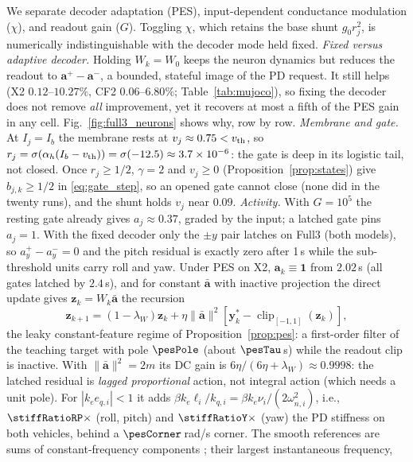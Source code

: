 \documentclass[letterpaper, 10 pt, conference]{ieeeconf}
\newcommand{\clip}{\operatorname{clip}}
\begin{document}
We separate decoder adaptation (PES), input-dependent conductance
modulation ($\chi$), and readout gain ($G$). Toggling $\chi$, which
retains the base shunt $g_0r_j^2$, is numerically indistinguishable with
the decoder mode held fixed. \emph{Fixed versus adaptive decoder.} Holding $W_k=W_0$ keeps the neuron
dynamics but reduces the readout to $\bm a^+-\bm a^-$, a bounded, stateful
image of the PD request. It still helps (X2 $0.12$--$10.27\%$, CF2
$0.06$--$6.80\%$; Table~\ref{tab:mujoco}), so fixing the decoder does not
remove \emph{all} improvement, yet it recovers at most a fifth of the PES
gain in any cell. Fig.~\ref{fig:full3_neurons} shows why, row by row.
\emph{Membrane and gate.} At $I_j=I_b$ the membrane rests at
$v_j\approx0.75<v_{\rm th}$, so
$r_j=\sigma(\alpha_h(I_b-v_{\rm th}))=\sigma(-12.5)\approx3.7\times10^{-6}$:
the gate is deep in its logistic tail, not closed. Once $r_j\ge1/2$,
$\gamma=2$ and $v_j\ge0$ (Proposition~\ref{prop:states}) give
$b_{j,k}\ge1/2$ in \eqref{eq:gate_step}, so an opened gate cannot close
(none did in the twenty runs), and the shunt holds $v_j$ near $0.09$.
\emph{Activity.} With $G=10^5$ the resting gate already gives
$a_j\approx0.37$, graded by the input; a latched gate pins $a_j=1$. With
the fixed decoder only the $\pm y$ pair latches on Full3 (both models), so
$a^+_y-a^-_y=0$ and the pitch residual is exactly zero after 1\,s while
the sub-threshold units carry roll and yaw. Under PES on X2,
$\bm a_k\equiv\bm1$ from $2.02$\,s (all gates latched by $2.4$\,s), and
for constant $\bar{\bm a}$ with inactive projection the direct update
gives $\bm z_k=W_k\bar{\bm a}$ the recursion
\begin{equation}
 \bm z_{k+1}=(1-\lambda_W)\bm z_k
 +\eta\|\bar{\bm a}\|^2[\bm y_k^*-\clip_{[-1,1]}(\bm z_k)],
 \label{eq:constantbasis}
\end{equation}
the leaky constant-feature regime of Proposition~\ref{prop:pes}: a
first-order filter of the teaching target with pole $\pesPole$ (about
$\pesTau$\,s) while the readout clip is inactive. With
$\|\bar{\bm a}\|^2=2m$ its DC gain is $6\eta/(6\eta+\lambda_W)\approx0.9998$:
the latched residual is \emph{lagged proportional} action, not integral
action (which needs a unit pole). For $|k_ee_{q,i}|<1$ it adds
$\beta k_e\ell_i/k_{q,i}=\beta k_e\nu_i/(2\omega_{n,i}^2)$, i.e.,
$\stiffRatioRP\times$ (roll, pitch) and $\stiffRatioY\times$ (yaw) the PD
stiffness on both vehicles, behind a $\pesCorner$\,rad/s corner. The smooth
references are sums of constant-frequency components
\cite{sandoval2018instantaneous}; their largest instantaneous frequency,
\end{document}
